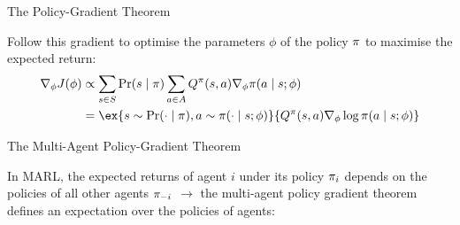 \begin{frame}[t]{The Policy-Gradient Theorem}
    \begin{reminderbox}
        Follow this gradient to optimise the parameters $\phi$ of the policy $\pi$ to maximise the expected return:
        \begin{align*}
            \gradient_\phi J(\phi) &\propto \sum_{\st\in\St} \pr(\st \mid \pol) \sum_{\ac\in\Ac} Q^\pol(\st, \ac) \gradient_\phi \pol(\ac \mid \st; \phi)\\
                                   &= \ex{\st \sim \pr(\cdot \mid \pol), \ac \sim \pol(\cdot \mid \st; \phi)}{Q^\pol(\st, \ac) \gradient_\phi \log \pol(\ac \mid \st; \phi)}
        \end{align*}
    \end{reminderbox}

    \vspace{1em}

\end{frame}

\begin{frame}[t]{The Multi-Agent Policy-Gradient Theorem}
    \begin{solutionbox}
        In MARL, the expected returns of agent $i$ under its policy $\pi_i$ depends on the policies of all other agents $\pi_{-i}$ $\rightarrow$ the multi-agent policy gradient theorem defines an expectation over the policies of  agents:
        \vspace{-1.5em}
    \end{solutionbox}




\end{frame}

